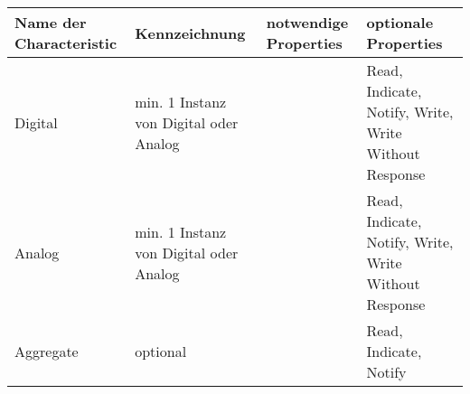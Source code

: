 \begin{tabular}{|p{3.5cm}|p{3.5cm}|p{3.5cm}|p{3.5cm}|}
\hline
\textbf{Name der Characteristic} & \textbf{Kennzeichnung} & \textbf{notwendige Properties} & \textbf{optionale Properties}  \\
\hline
Digital   & min. 1 Instanz von Digital oder Analog &  & Read, Indicate, Notify, Write, Write Without Response \\
\hline
Analog    & min. 1 Instanz von Digital oder Analog &  & Read, Indicate, Notify, Write, Write Without Response \\
\hline
Aggregate & optional                               &  & Read, Indicate, Notify \\
\hline
\end{tabular}
    
